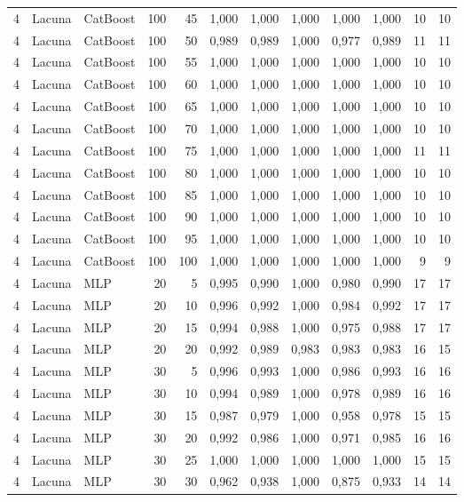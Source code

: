 \begin{longtable}{@{}rllrrrrrrrrr@{}}
4 & Lacuna & CatBoost & 100 & 45 & 1,000 & 1,000 & 1,000 & 1,000 & 1,000 & 10 & 10 \\
4 & Lacuna & CatBoost & 100 & 50 & 0,989 & 0,989 & 1,000 & 0,977 & 0,989 & 11 & 11 \\
4 & Lacuna & CatBoost & 100 & 55 & 1,000 & 1,000 & 1,000 & 1,000 & 1,000 & 10 & 10 \\
4 & Lacuna & CatBoost & 100 & 60 & 1,000 & 1,000 & 1,000 & 1,000 & 1,000 & 10 & 10 \\
4 & Lacuna & CatBoost & 100 & 65 & 1,000 & 1,000 & 1,000 & 1,000 & 1,000 & 10 & 10 \\
4 & Lacuna & CatBoost & 100 & 70 & 1,000 & 1,000 & 1,000 & 1,000 & 1,000 & 10 & 10 \\
4 & Lacuna & CatBoost & 100 & 75 & 1,000 & 1,000 & 1,000 & 1,000 & 1,000 & 11 & 11 \\
4 & Lacuna & CatBoost & 100 & 80 & 1,000 & 1,000 & 1,000 & 1,000 & 1,000 & 10 & 10 \\
4 & Lacuna & CatBoost & 100 & 85 & 1,000 & 1,000 & 1,000 & 1,000 & 1,000 & 10 & 10 \\
4 & Lacuna & CatBoost & 100 & 90 & 1,000 & 1,000 & 1,000 & 1,000 & 1,000 & 10 & 10 \\
4 & Lacuna & CatBoost & 100 & 95 & 1,000 & 1,000 & 1,000 & 1,000 & 1,000 & 10 & 10 \\
4 & Lacuna & CatBoost & 100 & 100 & 1,000 & 1,000 & 1,000 & 1,000 & 1,000 & 9 & 9 \\
4 & Lacuna & MLP & 20 & 5 & 0,995 & 0,990 & 1,000 & 0,980 & 0,990 & 17 & 17 \\
4 & Lacuna & MLP & 20 & 10 & 0,996 & 0,992 & 1,000 & 0,984 & 0,992 & 17 & 17 \\
4 & Lacuna & MLP & 20 & 15 & 0,994 & 0,988 & 1,000 & 0,975 & 0,988 & 17 & 17 \\
4 & Lacuna & MLP & 20 & 20 & 0,992 & 0,989 & 0,983 & 0,983 & 0,983 & 16 & 15 \\
4 & Lacuna & MLP & 30 & 5 & 0,996 & 0,993 & 1,000 & 0,986 & 0,993 & 16 & 16 \\
4 & Lacuna & MLP & 30 & 10 & 0,994 & 0,989 & 1,000 & 0,978 & 0,989 & 16 & 16 \\
4 & Lacuna & MLP & 30 & 15 & 0,987 & 0,979 & 1,000 & 0,958 & 0,978 & 15 & 15 \\
4 & Lacuna & MLP & 30 & 20 & 0,992 & 0,986 & 1,000 & 0,971 & 0,985 & 16 & 16 \\
4 & Lacuna & MLP & 30 & 25 & 1,000 & 1,000 & 1,000 & 1,000 & 1,000 & 15 & 15 \\
4 & Lacuna & MLP & 30 & 30 & 0,962 & 0,938 & 1,000 & 0,875 & 0,933 & 14 & 14 \\

\end{longtable}
